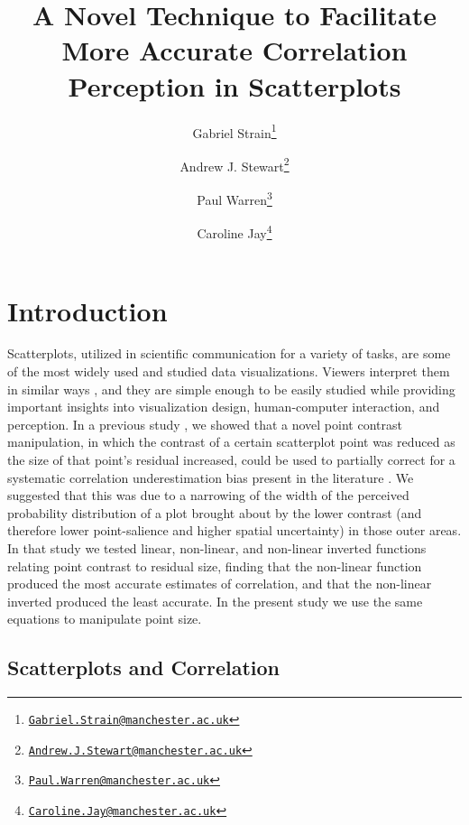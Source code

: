 \documentclass{vgtc}                          %
\title{A Novel Technique to Facilitate More Accurate Correlation Perception in Scatterplots}
\author{Gabriel Strain\thanks{\href{mailto:Gabriel.Strain@manchester.ac.uk}{\nolinkurl{Gabriel.Strain@manchester.ac.uk}}} %
\and Andrew J. Stewart\thanks{\href{mailto:Andrew.J.Stewart@manchester.ac.uk}{\nolinkurl{Andrew.J.Stewart@manchester.ac.uk}}} %
\and Paul Warren\thanks{\href{mailto:Paul.Warren@manchester.ac.uk}{\nolinkurl{Paul.Warren@manchester.ac.uk}}} %
\and Caroline Jay\thanks{\href{mailto:Caroline.Jay@manchester.ac.uk}{\nolinkurl{Caroline.Jay@manchester.ac.uk}}}} %
\affiliation{\scriptsize The University of Manchester}
\begin{document}

\firstsection{}

\maketitle

\hypertarget{introduction}{%
\section{Introduction}\label{introduction}}

Scatterplots, utilized in scientific communication for a variety of tasks,
are some of the most widely used and studied data visualizations. Viewers
interpret them in similar ways \cite{kay_heer_2015}, and they are simple
enough to be easily studied while providing important insights into visualization
design, human-computer interaction, and perception. In a previous study \cite{strain_2023},
we showed that a novel point contrast manipulation, in which the contrast of a certain
scatterplot point was reduced as the size of that point's residual increased, could be
used to partially correct for a systematic correlation underestimation bias present in the
literature \cite{strahan_1978, bobko_1979, cleveland_1982, lane_1985, lauer_1989, 
collyer_1990, meyer_1992}. We suggested that this was due to a narrowing of the width
of the perceived probability distribution of a plot brought
about by the lower contrast (and therefore lower point-salience and higher spatial uncertainty)
in those outer areas. In that study we tested linear, non-linear, and non-linear inverted functions relating
point contrast to residual size, finding that the non-linear function produced
the most accurate estimates of correlation, and that the non-linear inverted produced
the least accurate. In the present study we use the same equations to manipulate
point size.

\hypertarget{scatterplots-and-correlation}{%
\subsection{Scatterplots and Correlation}\label{scatterplots-and-correlation}}
\end{document}

